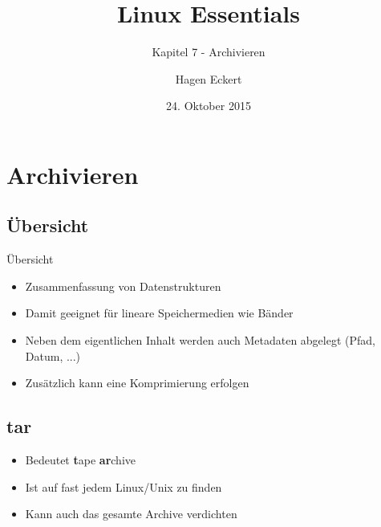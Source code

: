 \documentclass[aspectratio=43]{beamer}
\title[Linux Essentials  - Kapitel 7 - Archivieren]{Linux Essentials}
\subtitle{Kapitel 7 - Archivieren}
\author{Hagen Eckert}
\date{24. Oktober 2015}
\begin{document}
\logoframe

\frame{\titlepage}

\setcounter{tocdepth}{1}
\section[Gliederung]{}
\frame{\tableofcontents}

\section{Archivieren}
\subsection{Übersicht}
\begin{frame} 
	\begin{block}{Übersicht} 
	\begin{itemize}
	\item Zusammenfassung von Datenstrukturen
	\item Damit geeignet für lineare Speichermedien wie Bänder 
	\item Neben dem eigentlichen Inhalt werden auch Metadaten abgelegt  (Pfad, Datum, ...)
	\item Zusätzlich kann eine Komprimierung erfolgen
	\end{itemize}
	\end{block}


\end{frame}


\subsection{tar}
\begin{frame} 
	\begin{block}{} 
	\begin{itemize}
	\item Bedeutet \textbf{t}ape \textbf{ar}chive
	\item Ist auf fast jedem Linux/Unix zu finden
	\item Kann auch das gesamte Archive verdichten
	\end{itemize}
	\end{block}
\end{frame}
\end{document}
